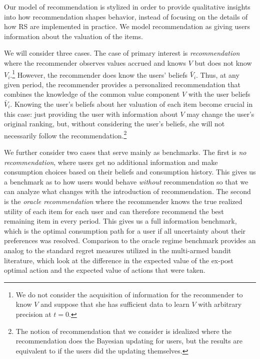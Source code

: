 \documentclass[sigconf]{acmart}
\newcommand{\xhdr}[1]{\vspace{1mm} \noindent{\bf #1}}
\begin{document}
\xhdr{Recommendation.}
Our model of recommendation is stylized in order to provide qualitative insights into how recommendation shapes behavior, instead of focusing on the details of how RS are implemented in practice. We model recommendation as giving users information about the valuation of the items.



We will consider three cases. The case of primary interest is \textit{recommendation} where the recommender observes values accrued and knows $V$ but does not know $V_i$.\footnote{We do not consider the acquisition of information for the recommender to know $V$ and suppose that she has sufficient data to learn $V$ with arbitrary precision at $t = 0$.} However, the recommender does know the users' beliefs $\bar V_i$. Thus, at any given period, the recommender provides a personalized recommendation that combines the knowledge of the common value component $V$ with the user beliefs $\bar V_i$. Knowing the user's beliefs about her valuation of each item become crucial in this case: just providing the user with information about $V$ may change the user's original ranking, but, without considering the user's beliefs, she will not necessarily follow the recommendation.\footnote{The notion of recommendation that we consider is idealized where the recommendation does the Bayesian updating for users, but the results are equivalent to if the users did the updating themselves.}



We further consider two cases that serve mainly as benchmarks. The first is \textit{no recommendation}, where users get no additional information and make consumption choices based on their beliefs and consumption history. This gives us a benchmark as to how users would behave \textit{without} recommendation so that we can analyze what changes with the introduction of recommendation. The second is the \textit{oracle recommendation} where the recommender knows the true realized utility of each item for each user and can therefore recommend the best remaining item in every period. This gives us a full information benchmark, which is the optimal consumption path for a user if all uncertainty about their preferences was resolved. Comparison to the oracle regime benchmark provides an analog to the standard regret measures utilized in the multi-armed bandit literature, which look at the difference in the expected value of the ex-post optimal action and the expected value of actions that were taken.
\end{document}
